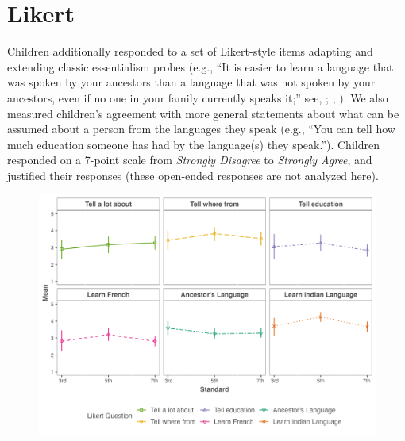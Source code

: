 






\section{Likert}
Children additionally responded to a set of Likert-style items adapting and extending classic essentialism probes  (e.g., ``It is easier to learn a language that was spoken by your ancestors than a language that was not spoken by your ancestors, even if no one in your family currently speaks it;'' see, \cite{gelman2007developmental}; \cite{byers2015bilingualism}; \cite{gelman1999biological}). We also measured children's agreement with more general statements about what can be assumed about a person from the languages they speak (e.g., ``You can tell how much education someone has had by the language(s) they speak.''). Children responded on a 7-point scale from \textit{Strongly Disagree} to \textit{Strongly Agree}, and justified their responses (these open-ended responses are not analyzed here).

\begin{figure}
    \centering
    \includegraphics[width=\linewidth]{figures/std_plots/likert_std.png}
    \caption{}
    \label{fig:likert}
\end{figure}